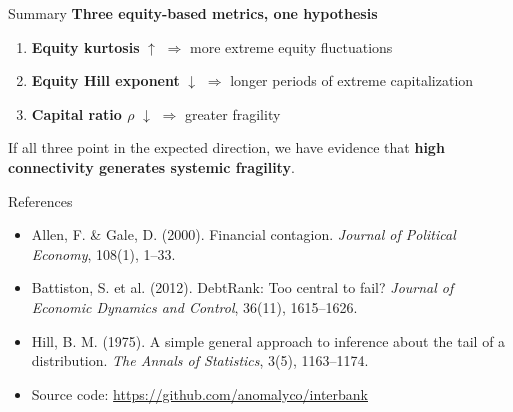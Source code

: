 \documentclass[11pt]{beamer}
\begin{document}
\begin{frame}{Summary}
\centering
\Large
\textbf{Three equity-based metrics, one hypothesis}

\vspace{1.5em}
\normalsize
\begin{enumerate}
    \item \textbf{Equity kurtosis} $\uparrow$ $\Rightarrow$ more extreme equity fluctuations
    \item \textbf{Equity Hill exponent} $\downarrow$ $\Rightarrow$ longer periods of extreme capitalization
    \item \textbf{Capital ratio $\rho$} $\downarrow$ $\Rightarrow$ greater fragility
\end{enumerate}

\vspace{1.5em}
\noindent If all three point in the expected direction, we have evidence
that \textbf{high connectivity generates systemic fragility}.
\end{frame}

\begin{frame}{References}
\small
\begin{itemize}
    \item Allen, F. \& Gale, D. (2000). Financial contagion. \textit{Journal of Political Economy}, 108(1), 1--33.
    \item Battiston, S. et al. (2012). DebtRank: Too central to fail? \textit{Journal of Economic Dynamics and Control}, 36(11), 1615--1626.
    \item Hill, B. M. (1975). A simple general approach to inference about the tail of a distribution. \textit{The Annals of Statistics}, 3(5), 1163--1174.
    \item Source code: \url{https://github.com/anomalyco/interbank}
\end{itemize}
\end{frame}
\end{document}
